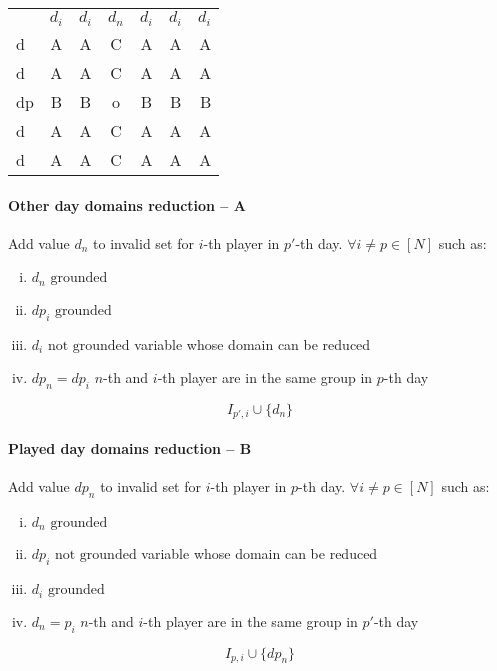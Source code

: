 \documentclass[a4paper]{article}
\theoremstyle{definition}
\theoremstyle{remark}
\begin{document}
\begin{tabular}{
 l | c | c || c || c | c | r |}
\multicolumn{1}{l}{} & \multicolumn{1}{c}{$d_i$}  & $d_i$ & $d_n$ & \multicolumn{1}{c}{$d_i$} & \multicolumn{1}{c}{$d_i$} & \multicolumn{1}{r}{$d_i$} \\
\cline{2-7}
d & A & A & C & A & A & A \\
\cline{2-7}
d & A & A & C & A & A & A \\
\hline
\hline
dp & B & B & o & B & B & B \\
\hline
\hline
d & A & A & C & A & A & A \\
\cline{2-7}
d & A & A & C & A & A & A \\
\cline{2-7}
\end{tabular} 


\paragraph{Other day domains reduction -- A}
Add value $d_n$ to invalid set for $i$-th player in $p'$-th day.
$ \forall i \neq p \in [N]$ such as:
\begin{enumerate}[(i)]
\item $d_n \text{ grounded}$
\item $dp_i \text{ grounded}$
\item $d_i \text{ not grounded}$ \hfill variable whose domain can be reduced 
\item $dp_n = dp_i$ \hfill $n$-th and $i$-th player are in the same group in $p$-th day
\end{enumerate}
$$ I_{p',i} \cup \{ d_n \} $$

\paragraph{Played day domains reduction -- B}
Add value $dp_n$ to invalid set for $i$-th player in  $p$-th day.
$ \forall i \neq p \in [N]$ such as:
\begin{enumerate}[(i)]
\item $d_n \text{ grounded}$
\item $dp_i \text{ not grounded}$ \hfill variable whose domain can be reduced 
\item $d_i \text{ grounded}$ 
\item $d_n = p_i$ \hfill $n$-th and $i$-th player are in the same group in $p'$-th day
\end{enumerate}
$$ I_{p,i} \cup \{ dp_n \} $$
\end{document}

